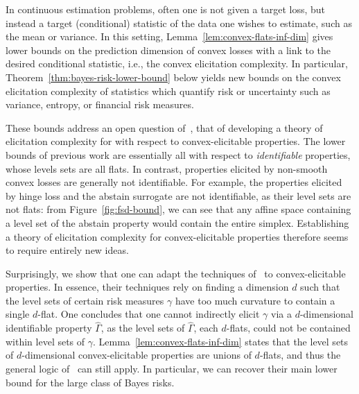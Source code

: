 \documentclass[anon,12pt]{colt2021} %
\newcommand{\R}{\mathcal{R}}
\newcommand{\ones}{\mathbbm{1}}
\begin{document}
In continuous estimation problems, often one is not given a target loss, but instead a target (conditional) statistic of the data one wishes to estimate, such as the mean or variance.
In this setting, Lemma~\ref{lem:convex-flats-inf-dim} gives lower bounds on the prediction dimension of convex losses with a link to the desired conditional statistic, i.e., the convex elicitation complexity.
In particular,
Theorem~\ref{thm:bayes-risk-lower-bound} below yields new bounds on the convex elicitation complexity of statistics which quantify risk or uncertainty such as variance, entropy, or financial risk measures.

These bounds address an open question of~\citet{frongillo2020elicitation}, that of developing a theory of elicitation complexity for with respect to convex-elicitable properties.
The lower bounds of previous work are essentially all with respect to \emph{identifiable} properties, whose levels sets are all flats.
In contrast, properties elicited by non-smooth convex losses are generally not identifiable.
For example, the properties elicited by hinge loss and the abstain surrogate are not identifiable, as their level sets are not flats: from Figure~\ref{fig:fsd-bound}, we can see that any affine space containing a level set of the abstain property would contain the entire simplex.
Establishing a theory of elicitation complexity for convex-elicitable properties therefore seems to require entirely new ideas.

Surprisingly, we show that one can adapt the techniques of~\citet{frongillo2020elicitation} to convex-elicitable properties.
In essence, their techniques rely on finding a dimension $d$ such that the level sets of certain risk measures $\gamma$ have too much curvature to contain a single $d$-flat.
One concludes that one cannot indirectly elicit $\gamma$ via a $d$-dimensional identifiable property $\hat\Gamma$, as the level sets of $\hat\Gamma$, each $d$-flats, could not be contained within level sets of $\gamma$.
Lemma~\ref{lem:convex-flats-inf-dim} states that the level sets of $d$-dimensional convex-elicitable properties are unions of $d$-flats, and thus the general logic of~\citet{frongillo2020elicitation} can still apply.
In particular, we can recover their main lower bound for the large class of Bayes risks.
\end{document}
